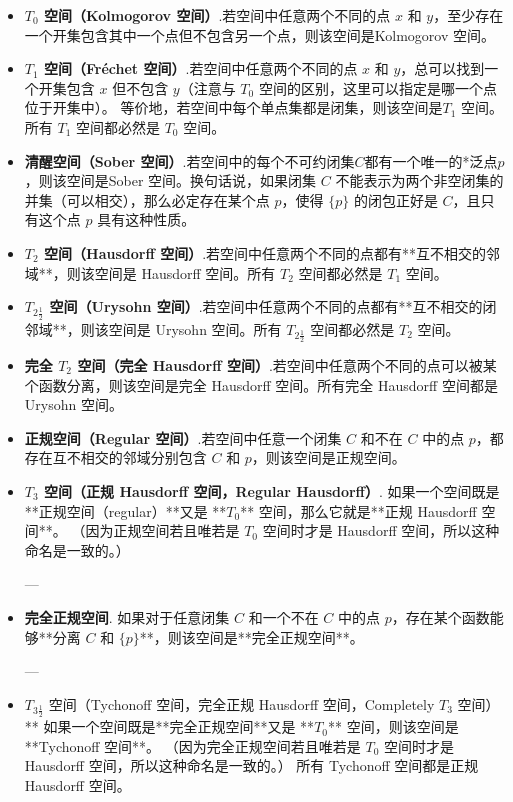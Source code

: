 \begin{itemize}
\item \textbf{$T_0$ 空间（Kolmogorov 空间）}.若空间中任意两个不同的点 $x$ 和 $y$，至少存在一个开集包含其中一个点但不包含另一个点，则该空间是Kolmogorov 空间。
\item \textbf{$T_1$ 空间（Fréchet 空间）}.若空间中任意两个不同的点 $x$ 和 $y$，总可以找到一个开集包含 $x$ 但不包含 $y$（注意与 $T_0$ 空间的区别，这里可以指定是哪一个点位于开集中）。
  等价地，若空间中每个单点集都是闭集，则该空间是$T_1$ 空间。
  所有 $T_1$ 空间都必然是 $T_0$ 空间。
\item \textbf{清醒空间（Sober 空间）}.若空间中的每个不可约闭集$C$都有一个唯一的*泛点$p$，则该空间是Sober 空间。换句话说，如果闭集 $C$ 不能表示为两个非空闭集的并集（可以相交），那么必定存在某个点 $p$，使得 $\{p\}$ 的闭包正好是 $C$，且只有这个点 $p$ 具有这种性质。
\item \textbf{ $T_2$ 空间（Hausdorff 空间）}.若空间中任意两个不同的点都有**互不相交的邻域**，则该空间是 Hausdorff 空间。所有 $T_2$ 空间都必然是 $T_1$ 空间。
\item \textbf{$T_{2\frac{1}{2}}$ 空间（Urysohn 空间）}.若空间中任意两个不同的点都有**互不相交的闭邻域**，则该空间是 Urysohn 空间。所有 $T_{2\frac{1}{2}}$ 空间都必然是 $T_2$ 空间。
\item \textbf{完全 $T_2$ 空间（完全 Hausdorff 空间）}.若空间中任意两个不同的点可以被某个函数分离，则该空间是完全 Hausdorff 空间。所有完全 Hausdorff 空间都是 Urysohn 空间。
\item \textbf{正规空间（Regular 空间）}.若空间中任意一个闭集 $C$ 和不在 $C$ 中的点 $p$，都存在互不相交的邻域分别包含 $C$ 和 $p$，则该空间是正规空间。

\item \textbf{$T_3$ 空间（正规 Hausdorff 空间，Regular Hausdorff）}.
如果一个空间既是**正规空间（regular）**又是 **$T_0$** 空间，那么它就是**正规 Hausdorff 空间**。
（因为正规空间若且唯若是 $T_0$ 空间时才是 Hausdorff 空间，所以这种命名是一致的。）

---

\item \textbf{完全正规空间}.
如果对于任意闭集 $C$ 和一个不在 $C$ 中的点 $p$，存在某个函数能够**分离 $C$ 和 $\{p\}$**，则该空间是**完全正规空间**。

---

\item $T_{3\frac{1}{2}}$ 空间（Tychonoff 空间，完全正规 Hausdorff 空间，Completely $T_3$ 空间）**
如果一个空间既是**完全正规空间**又是 **$T_0$** 空间，则该空间是**Tychonoff 空间**。
（因为完全正规空间若且唯若是 $T_0$ 空间时才是 Hausdorff 空间，所以这种命名是一致的。）
所有 Tychonoff 空间都是正规 Hausdorff 空间。


\end{itemize}
